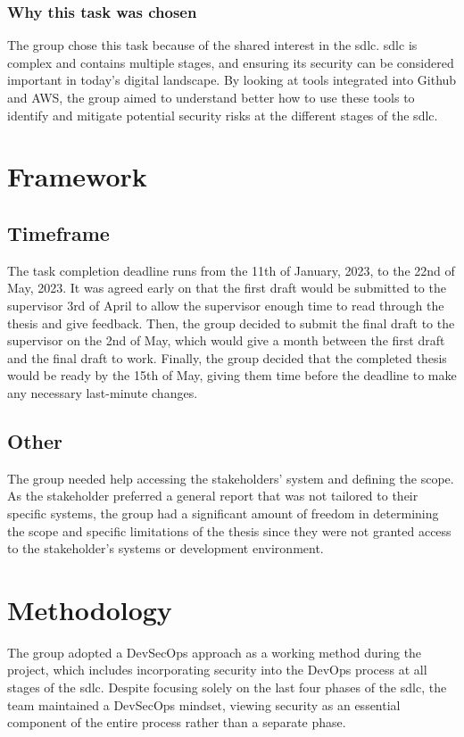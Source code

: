 \subsubsection{Why this task was chosen}
The group chose this task because of the shared interest in the \acrlong{sdlc}. \acrshort{sdlc} is complex and contains multiple stages, and ensuring its security can be considered important in today's digital landscape. By looking at tools integrated into Github and AWS, the group aimed to understand better how to use these tools to identify and mitigate potential security risks at the different stages of the \acrshort{sdlc}.
\newpage
\section{Framework}

\subsection{Timeframe}
The task completion deadline runs from the 11th of January, 2023, to the 22nd of May, 2023. It was agreed early on that the first draft would be submitted to the supervisor 3rd of April to allow the supervisor enough time to read through the thesis and give feedback. Then, the group decided to submit the final draft to the supervisor on the 2nd of May, which would give a month between the first draft and the final draft to work. Finally, the group decided that the completed thesis would be ready by the 15th of May, giving them time before the deadline to make any necessary last-minute changes.


\subsection{Other}
The group needed help accessing the stakeholders' system and defining the scope. As the stakeholder preferred a general report that was not tailored to their specific systems, the group had a significant amount of freedom in determining the scope and specific limitations of the thesis since they were not granted access to the stakeholder's systems or development environment.

\section{Methodology}
The group adopted a DevSecOps approach as a working method during the project, which includes incorporating security into the DevOps process at all stages of the \acrshort{sdlc}. Despite focusing solely on the last four phases of the \acrshort{sdlc}, the team maintained a DevSecOps mindset, viewing security as an essential component of the entire process rather than a separate phase. 

